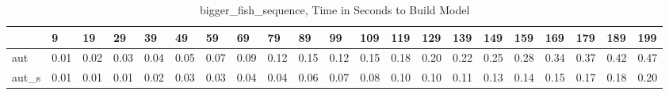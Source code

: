 \begin{table}
\caption{bigger_fish_sequence, Time in Seconds to Build Model}
\label{bigger_fish_sequence_model_time}
\begin{tabular}{lllllllllllllllllllll}
\toprule
 & 9 & 19 & 29 & 39 & 49 & 59 & 69 & 79 & 89 & 99 & 109 & 119 & 129 & 139 & 149 & 159 & 169 & 179 & 189 & 199 \\
\midrule
aut & 0.01 & 0.02 & 0.03 & 0.04 & 0.05 & 0.07 & 0.09 & 0.12 & 0.15 & 0.12 & 0.15 & 0.18 & 0.20 & 0.22 & 0.25 & 0.28 & 0.34 & 0.37 & 0.42 & 0.47 \\
aut_s & 0.01 & 0.01 & 0.01 & 0.02 & 0.03 & 0.03 & 0.04 & 0.04 & 0.06 & 0.07 & 0.08 & 0.10 & 0.10 & 0.11 & 0.13 & 0.14 & 0.15 & 0.17 & 0.18 & 0.20 \\
\bottomrule
\end{tabular}
\end{table}
